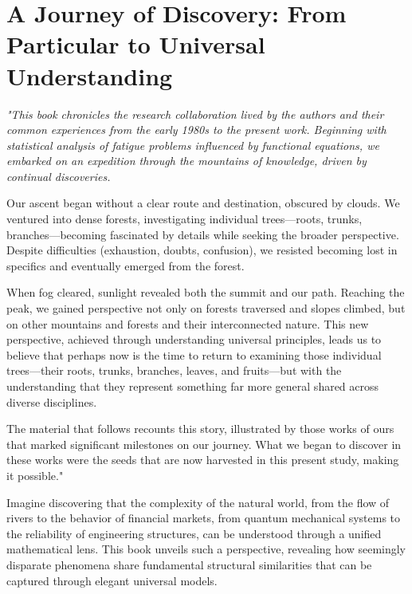 \documentclass[
	11pt, %
	fleqn, %
	a4paper, %
]{LegrandOrangeBook}
\begin{document}
\section{A Journey of Discovery: From  Particular to Universal Understanding}
\begin{center}
\begin{minipage}{0.9\textwidth}
\setlength{\parskip}{2mm}
\setlength{\baselineskip}{1.1em}
{\it\footnotesize
"This book chronicles the research collaboration lived by the authors and their common experiences from the early 1980s to the present work. Beginning with statistical analysis of fatigue problems influenced by functional equations, we embarked on an expedition through the mountains of knowledge, driven by continual discoveries.

Our ascent began without a clear route and destination, obscured by clouds. We ventured into dense forests, investigating individual trees—roots, trunks, branches—becoming fascinated by details while seeking the broader perspective. Despite difficulties (exhaustion, doubts, confusion), we resisted becoming lost in specifics and eventually emerged from the forest.

When fog cleared, sunlight revealed both the summit and our path. Reaching the peak, we gained perspective not only on forests traversed and slopes climbed, but on other mountains and forests and their interconnected nature. This new perspective, achieved through understanding universal principles, leads us to believe that perhaps now is the time to return to examining those individual trees—their roots, trunks, branches, leaves, and fruits—but with the understanding that they represent something far more general shared across diverse disciplines.

The material that follows recounts this story, illustrated by those works of ours that marked significant milestones on our journey. What we began to discover in these works were the seeds that are now harvested in this present study, making it possible."}
\end{minipage}
\end{center}

%



Imagine discovering that the complexity of the natural world, from the flow of rivers to the behavior of financial markets, from quantum mechanical systems to the reliability of engineering structures, can be understood through a unified mathematical lens. This book unveils such a perspective, revealing how seemingly disparate phenomena share fundamental structural similarities that can be captured through elegant universal models.
\end{document}
